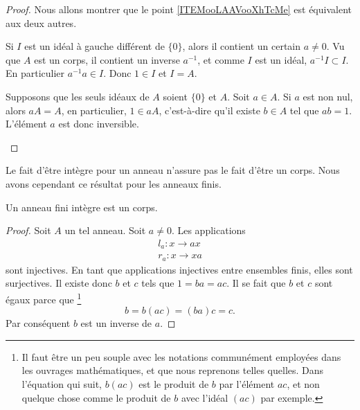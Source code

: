\begin{proof}
    Nous allons montrer que le point \ref{ITEMooLAAVooXhTcMe} est équivalent aux deux autres.
    \begin{subproof}
        \item[\ref{ITEMooLPWHooDJpTbR} implique \ref{ITEMooDGZIooRopYGx}]
            Si \( I\) est un idéal à gauche différent de \( \{ 0 \}\), alors il contient un certain \( a\neq 0\). Vu que \( A\) est un corps, il contient un inverse \( a^{-1}\), et comme \( I\) est un idéal, \( a^{-1} I\subset I\). En particulier \( a^{-1}a\in I\). Donc \( 1\in I\) et \( I=A\).
        \item[\ref{ITEMooDGZIooRopYGx} implique \ref{ITEMooLAAVooXhTcMe}]

            Supposons que les seuls idéaux de \( A\) soient \( \{ 0 \}\) et \( A\). Soit \( a\in A\). Si \( a\) est non nul, alors \( aA=A\), en particulier, \( 1\in aA\), c'est-à-dire qu'il existe \( b\in A\) tel que \( ab=1\). L'élément \( a\) est donc inversible.
    \end{subproof}
\end{proof}

Le fait d'être intègre pour un anneau n'assure pas le fait d'être un corps. Nous avons cependant ce résultat pour les anneaux finis.

\begin{proposition}     \label{PropanfinintimpCorp}
    Un anneau fini intègre est un corps.
\end{proposition}

\begin{proof}
    Soit \( A\) un tel anneau. Soit \( a\neq 0\). Les applications
    \begin{subequations}
        \begin{align}
            l_a\colon x\to ax\\
            r_a\colon x\to xa
        \end{align}
    \end{subequations}
    sont injectives. En tant que applications injectives entre ensembles finis, elles sont surjectives. Il existe donc \( b\) et \( c\) tels que \( 1=ba=ac\). Il se fait que \( b\) et \( c\) sont égaux parce que
    \footnote{Il faut être un peu souple avec les notations communément employées dans les ouvrages mathématiques, et que nous reprenons telles quelles. Dans l'équation qui suit, \( b(ac)\) est le produit de \( b\) par l'élément \( ac\), et non quelque chose comme le produit de \( b\) avec l'idéal \( (ac)\) par exemple.}
    \begin{equation}
        b=b(ac)=(ba)c=c.
    \end{equation}
    Par conséquent \( b\) est un inverse de \( a\).
\end{proof}



